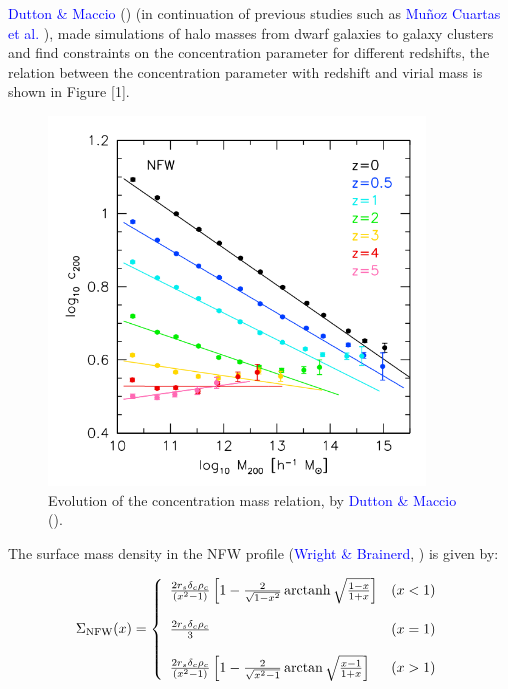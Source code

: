 \begin{appendices}
\textcolor{blue}{Dutton \& Maccio} (\citeyear{Reference23}) (in continuation of previous studies such as \textcolor{blue}{Mu\~noz Cuartas et al.} \citeyear{Reference12}), made simulations of halo masses from dwarf galaxies to galaxy clusters and find constraints on the concentration parameter for different redshifts, the relation between the concentration parameter with redshift and virial mass is shown in Figure [1].

\begin{figure}[H]
\centering
\includegraphics[width=10cm]{images/dutton.png}
\caption[Evolution of the concentration mass relation]{Evolution of the concentration mass relation, by \textcolor{blue}{Dutton \& Maccio} (\citeyear{Reference23}).}
\end{figure}

The surface mass density in the NFW profile (\textcolor{blue}{Wright \& Brainerd}, \citeyear{Reference4}) is given by:

\begin{equation}
\Sigma_{\text{NFW}}(x) = \left\lbrace
\begin{array}{lll}
\frac{2r_{s}\delta_{c}\rho_{c}}{\left(x^{2}-1\right)}\left[1-\frac{2}{\sqrt{1-x^{2}}}\operatorname{arctanh}\sqrt{\frac{1-x}{1+x}}\right] & (x<1)\\\\
\frac{2r_{s}\delta_{c}\rho_{c}}{3} & (x=1)\\\\
\frac{2r_{s}\delta_{c}\rho_{c}}{\left(x^{2}-1\right)}\left[1-\frac{2}{\sqrt{x^{2}-1}}\arctan\sqrt{\frac{x-1}{1+x}}\right] & (x>1)
\end{array}
\right.
\end{equation} 


\end{appendices}
